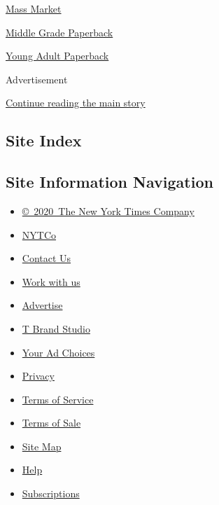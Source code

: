 \href{/books/best-sellers/mass-market-monthly/}{Mass Market}

\href{/books/best-sellers/middle-grade-paperback-monthly/}{Middle Grade
Paperback}

\href{/books/best-sellers/young-adult-paperback-monthly/}{Young Adult
Paperback}

Advertisement

\protect\hyperlink{after-bottom}{Continue reading the main story}

\hypertarget{site-index}{%
\subsection{Site Index}\label{site-index}}

\hypertarget{site-information-navigation}{%
\subsection{Site Information
Navigation}\label{site-information-navigation}}

\begin{itemize}
\tightlist
\item
  \href{https://help.nytimes3xbfgragh.onion/hc/en-us/articles/115014792127-Copyright-notice}{©~2020~The
  New York Times Company}
\end{itemize}

\begin{itemize}
\tightlist
\item
  \href{https://www.nytco.com/}{NYTCo}
\item
  \href{https://help.nytimes3xbfgragh.onion/hc/en-us/articles/115015385887-Contact-Us}{Contact
  Us}
\item
  \href{https://www.nytco.com/careers/}{Work with us}
\item
  \href{https://nytmediakit.com/}{Advertise}
\item
  \href{http://www.tbrandstudio.com/}{T Brand Studio}
\item
  \href{https://www.nytimes3xbfgragh.onion/privacy/cookie-policy\#how-do-i-manage-trackers}{Your
  Ad Choices}
\item
  \href{https://www.nytimes3xbfgragh.onion/privacy}{Privacy}
\item
  \href{https://help.nytimes3xbfgragh.onion/hc/en-us/articles/115014893428-Terms-of-service}{Terms
  of Service}
\item
  \href{https://help.nytimes3xbfgragh.onion/hc/en-us/articles/115014893968-Terms-of-sale}{Terms
  of Sale}
\item
  \href{https://spiderbites.nytimes3xbfgragh.onion}{Site Map}
\item
  \href{https://help.nytimes3xbfgragh.onion/hc/en-us}{Help}
\item
  \href{https://www.nytimes3xbfgragh.onion/subscription?campaignId=37WXW}{Subscriptions}
\end{itemize}
